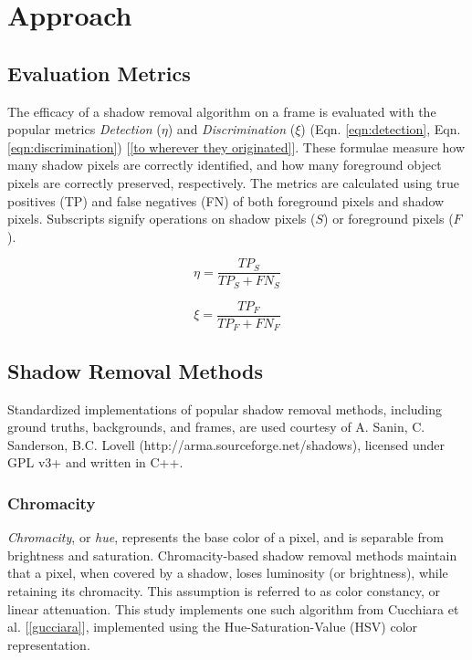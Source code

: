 \documentclass[12pt]{report}
\begin{document}
\doublespacing

\clearpage
\chapter{Approach}

\section{Evaluation Metrics} \label{section:eval_metrics}

The efficacy of a shadow removal algorithm on a frame is evaluated with the popular metrics \textit{Detection} ($\eta$) and \textit{Discrimination} ($\xi$) (Eqn. \ref{eqn:detection}, Eqn. \ref{eqn:discrimination}) [\ref{to wherever they originated}]. These formulae measure how many shadow pixels are correctly identified, and how many foreground object pixels are correctly preserved, respectively. The metrics are calculated using true positives (TP) and false negatives (FN) of both foreground pixels and shadow pixels. Subscripts signify operations on shadow pixels ($S$) or foreground pixels ($F$).

\begin{equation}
\eta = \dfrac{TP_{S}}{TP_{S} + FN_{S}} \label{eqn:detection}
\end{equation}

\begin{equation}
\xi = \dfrac{TP_{F}}{TP_{F} + FN_{F}} \label{eqn:discrimination}
\end{equation}

\section{Shadow Removal Methods} \label{section:removalmethods}

Standardized implementations of popular shadow removal methods, including ground truths, backgrounds, and frames, are used courtesy of A. Sanin, C. Sanderson, B.C. Lovell (http://arma.sourceforge.net/shadows), licensed under GPL v3+ and written in C++.

\subsection{Chromacity}

\textit{Chromacity}, or \textit{hue}, represents the base color of a pixel, and is separable from brightness and saturation. Chromacity-based shadow removal methods maintain that a pixel, when covered by a shadow, loses luminosity (or brightness), while retaining its chromacity. This assumption is referred to as  color constancy, or linear attenuation. This study implements one such algorithm from Cucchiara et al. [\ref{gucciara}], implemented using the Hue-Saturation-Value (HSV) color representation. 
\end{document}
